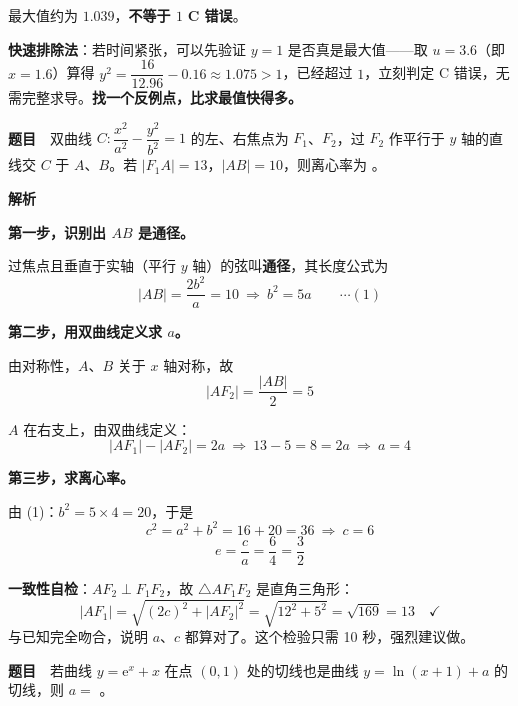 最大值约为 $1.039$，\textbf{不等于 $1$}  \textbf{C 错误}。


\begin{gktip}
\textbf{快速排除法}：若时间紧张，可以先验证 $y=1$ 是否真是最大值——取 $u=3.6$（即 $x=1.6$）算得 $y^2=\dfrac{16}{12.96}-0.16\approx1.075>1$，已经超过 $1$，立刻判定 C 错误，无需完整求导。\textbf{找一个反例点，比求最值快得多。}
\end{gktip}

\par\medskip



\textbf{题目}　双曲线 $C:\dfrac{x^{2}}{a^{2}}-\dfrac{y^{2}}{b^{2}}=1$ 的左、右焦点为 $F_1$、$F_2$，过 $F_2$ 作平行于 $y$ 轴的直线交 $C$ 于 $A$、$B$。若 $\left|F_1A\right|=13$，$|AB|=10$，则离心率为 \gkblank{}。

\textbf{解析}

\textbf{第一步，识别出 $AB$ 是通径。}

过焦点且垂直于实轴（平行 $y$ 轴）的弦叫\textbf{通径}，其长度公式为
\[|AB|=\frac{2b^{2}}{a}=10\ \Longrightarrow\ b^{2}=5a\qquad\cdots(1)\]

\textbf{第二步，用双曲线定义求 $a$。}

由对称性，$A$、$B$ 关于 $x$ 轴对称，故
\[\left|AF_2\right|=\frac{|AB|}2=5\]

$A$ 在右支上，由双曲线定义：
\[\left|AF_1\right|-\left|AF_2\right|=2a\ \Longrightarrow\ 13-5=8=2a\ \Longrightarrow\ a=4\]

\textbf{第三步，求离心率。}

由 (1)：$b^{2}=5\times4=20$，于是
\[c^{2}=a^{2}+b^{2}=16+20=36\ \Longrightarrow\ c=6\]
\[e=\frac ca=\frac64=\frac32\]


\begin{gktip}
\textbf{一致性自检}：$AF_2\perp F_1F_2$，故 $\triangle AF_1F_2$ 是直角三角形：
\[\left|AF_1\right|=\sqrt{(2c)^{2}+\left|AF_2\right|^{2}}=\sqrt{12^{2}+5^{2}}=\sqrt{169}=13\quad\checkmark\]
与已知完全吻合，说明 $a$、$c$ 都算对了。这个检验只需 10 秒，强烈建议做。
\end{gktip}

\par\medskip


\textbf{题目}　若曲线 $y=\mathrm e^{x}+x$ 在点 $(0,1)$ 处的切线也是曲线 $y=\ln(x+1)+a$ 的切线，则 $a=$ \gkblank{}。

